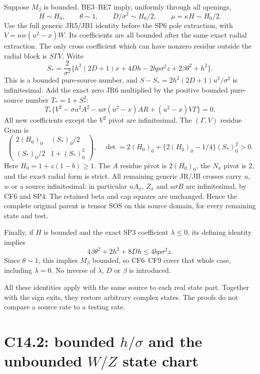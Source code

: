 Suppose $M_\beta$ is bounded. BE3--BE7 imply, uniformly through
all openings,
\[
 H\sim H_0,\qquad \theta\sim1,\qquad
 D/\sigma^2\sim H_0/2,\qquad \mu=\kappa H\sim H_0/2.
                                                               \tag{CF6}
\]
Use the full generic JR5/JB1 identity before the SP6 pole extraction,
with $V=uw(u^2-x)W$. Its coefficients are all bounded after the
same exact radial extraction. The only cross coefficient which can
have nonzero residue outside the radial block is $S\Gamma V$.
Write
\[
 S_*=\frac{2}{\sigma^2}
 \{h^2(2D+1)x+4Dh-2bp\sigma^2z
                         +2\beta\theta^2+h^2\}.
                                                               \tag{CF7}
\]
This is a bounded pure-source number, and
$S-S_*=2h^2(2D+1)u^2/\sigma^2$ is infinitesimal.
Add the exact zero JR6 multiplied by the positive bounded
pure-source number $T_*=1+S_*^2$:
\[
 T_*\{V^2-\sigma u^2A^2
       -u\sigma(u^2-x)AR+(u^2-x)V\Gamma\}=0.        \tag{CF8}
\]
All new coefficients except the $V^2$ pivot are infinitesimal.
The $(\Gamma,V)$ residue Gram is
\[
 \begin{pmatrix}
 2(H_0)_0&(S_*)_0/2\\
 (S_*)_0/2&1+(S_*)_0^2
 \end{pmatrix},
\quad
 \det=2(H_0)_0+
          \{2(H_0)_0-1/4\}(S_*)_0^2>0.              \tag{CF9}
\]
Here $H_0=1+z(1-b)\ge1$. The $A$ residue pivot is $2(H_0)_0$,
the $N_x$ pivot is $2$, and the exact radial form is strict.
All remaining generic JR/JB crosses carry $u$, $w$ or a source
infinitesimal: in particular $uA_x$, $Z_x$ and $u\sigma B$ are
infinitesimal, by CF6 and SP4. The retained beta and cap squares
are unchanged. Hence the complete original parent is tensor SOS
on this source domain, for every remaining state and test.

Finally, if $H$ is bounded and the exact SP3 coefficient $\lambda\le0$,
its defining identity implies
\[
 4\beta\theta^2+2h^2+8Dh\le4bp\sigma^2z.
\]
Since $\theta\sim1$, this implies $M_\beta$ bounded, so CF6--CF9
cover that whole case, including $\lambda=0$. No inverse of
$\lambda$, $D$ or $\beta$ is introduced.

All these identities apply with the same source to each real state
part. Together with the sign exits, they restore arbitrary complex
states. The proofs do not compare a source rate to a testing rate.


\section{\texorpdfstring{C14.2: bounded $h/\sigma$ and the unbounded $W/Z$ state chart}{C14.2: bounded h/sigma and the unbounded W/Z state chart}}
\label{component:pcb3428d66a71}

